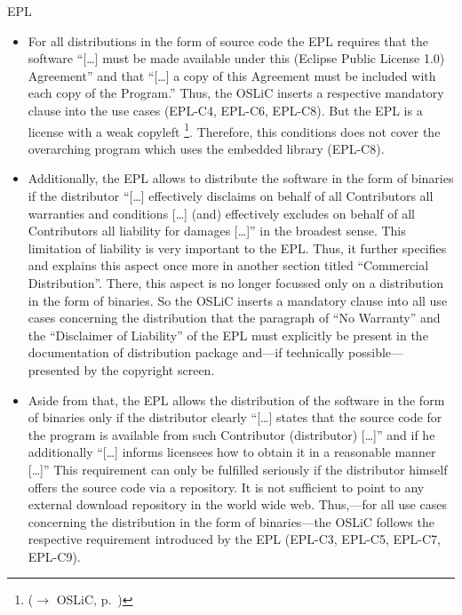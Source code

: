 \begin{license}{EPL}
\begin{itemize}
  \item For all distributions in the form of source code the EPL requires that
    the software \enquote{[\ldots] must be made available under this (Eclipse
    Public License 1.0) Agreement} and that \enquote{[\ldots] a copy of this
    Agreement must be included with each copy of the Program.} 
    Thus, the OSLiC inserts a respective mandatory clause into the use cases
    (EPL-C4, EPL-C6, EPL-C8). But the EPL is a license with a weak copyleft%
    \footnote{($\rightarrow$ OSLiC, p.\ )}. 
    Therefore, this conditions does not cover the overarching program which uses
    the embedded library (EPL-C8).
    
  \item Additionally, the EPL allows to distribute the software in the form
    of binaries if the distributor \enquote{[\ldots] effectively disclaims on
    behalf of all Contributors all warranties and conditions [\ldots] (and)
    effectively excludes on behalf of all Contributors all liability for
    damages [\ldots]} in the broadest sense. This limitation of
    liability is very important to the EPL. Thus, it further specifies and
    explains this aspect once more in another section titled \enquote{Commercial
    Distribution}. There, this aspect is no longer focussed only on a
    distribution in the form of binaries. So the OSLiC inserts a
    mandatory clause into all use cases concerning the distribution that the
    paragraph of \enquote{No Warranty} and the \enquote{Disclaimer
    of Liability} of the EPL must explicitly be present in the
    documentation of distribution package and---if technically possible---%
    presented by the copyright screen.   
  
  \item Aside from that, the EPL allows the distribution of the software in the
    form of binaries only if the distributor clearly \enquote{[\ldots] states that
    the source code for the program is available from such Contributor
    (distributor) [\ldots]} and if he additionally \enquote{[\ldots] informs
    licensees how to obtain it in a reasonable manner [\ldots]} 
    This requirement can only be fulfilled seriously if the distributor himself
    offers the source code via a repository. It is not sufficient to point to
    any external download repository in the world wide web. Thus,---for all use
    cases concerning the distribution in the form of binaries---the OSLiC
    follows the respective requirement introduced by the EPL (EPL-C3, EPL-C5,
    EPL-C7, EPL-C9).  
  

\end{itemize}
\end{license}
